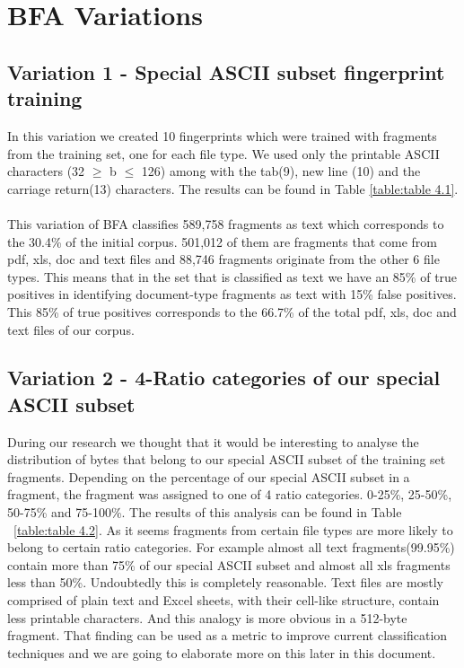 \chapter{BFA Variations}

\section{Variation 1 - Special ASCII subset fingerprint training}

In this variation we created 10 fingerprints which were trained with fragments from the training set, one for each file type. We used only the printable ASCII characters (32 $\geq$  b $\leq$ 126) among with the tab(9), new line (10) and the carriage return(13) characters. The results can be found in Table \ref{table:table 4.1}.\\\\
 This variation of BFA classifies 589,758 fragments as text which corresponds to the 30.4\% of the initial corpus. 501,012 of them are fragments that come from pdf, xls, doc and text files and 88,746 fragments originate from the other 6 file types. This means that in the set that is classified as text we have an 85\% of true positives in identifying document-type fragments as text with 15\% false positives. This 85\% of true positives corresponds to the 66.7\% of the total pdf, xls, doc and text files of our corpus.




\section{Variation 2 - 4-Ratio categories of our special ASCII subset}
During our research we thought that it would be interesting to analyse the distribution of bytes that belong to our special ASCII subset of the training set fragments. Depending on the percentage of our special ASCII subset in a fragment, the fragment was assigned to one of 4 ratio categories. 0-25\%, 25-50\%, 50-75\% and 75-100\%. The results of this analysis can be found in Table ~\ref{table:table 4.2}. As it seems fragments from certain file types are more likely to belong to certain ratio categories. For example almost all text fragments(99.95\%) contain more than 75\% of our special ASCII subset and almost all xls fragments less than 50\%. Undoubtedly this is completely reasonable. Text files are mostly comprised of plain text and Excel sheets, with their cell-like structure, contain less printable characters. And this analogy is more obvious in a 512-byte fragment. That finding can be used as a metric to improve current classification techniques and we are going to elaborate more on this later in this document.\\


